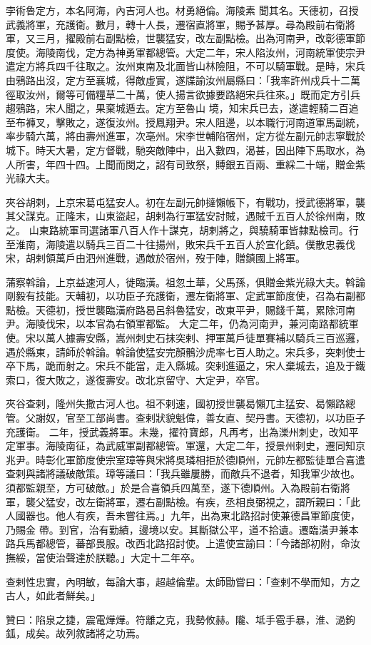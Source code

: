\begin{pinyinscope}
 孛術魯定方，本名阿海，內吉河人也。材勇絕倫。海陵素
 聞其名。天德初，召授武義將軍，充護衛。數月，轉十人長，遷宿直將軍，賜予甚厚。尋為殿前右衛將軍，又三月，擢殿前右副點檢，世襲猛安，改左副點檢。出為河南尹，改彰德軍節度使。海陵南伐，定方為神勇軍都總管。大定二年，宋人陷汝州，河南統軍使宗尹遣定方將兵四千往取之。汝州東南及北面皆山林險阻，不可以騎軍戰。是時，宋兵由鴉路出沒，定方至襄城，得敵虛實，遂牒諭汝州屬縣曰：「我率許州戍兵十二萬徑取汝州，爾等可備糧草二十萬，使人揚言欲據要路絕宋兵往來。」既而定方引兵趨鴉路，宋人聞之，果棄城遁去。定方至魯山
 境，知宋兵已去，遂遣輕騎二百追至布褲叉，擊敗之，遂復汝州。授鳳翔尹。宋人阻邊，以本職行河南道軍馬副統，率步騎六萬，將由壽州進軍，次亳州。宋李世輔陷宿州，定方從左副元帥志寧戰於城下。時天大暑，定方督戰，馳突敵陣中，出入數四，渴甚，因出陣下馬取水，為人所害，年四十四。上聞而閔之，詔有司致祭，賻銀五百兩、重綵二十端，贈金紫光祿大夫。



 夾谷胡剌，上京宋葛屯猛安人。初在左副元帥撻懶帳下，有戰功，授武德將軍，襲其父謀克。正隆末，山東盜起，胡剌為行軍猛安討賊，遇賊千五百人於徐州南，敗之。
 山東路統軍司選諸軍八百人作十謀克，胡剌將之，與驍騎軍皆隸點檢司。行至淮南，海陵遣以騎兵三百二十往揚州，敗宋兵千五百人於宣化鎮。僕散忠義伐宋，胡剌領萬戶由泗州進戰，遇敵於宿州，歿于陣，贈鎮國上將軍。



 蒲察斡論，上京益速河人，徙臨潢。祖忽土華，父馬孫，俱贈金紫光祿大夫。斡論剛毅有技能。天輔初，以功臣子充護衛，遷左衛將軍、定武軍節度使，召為右副都點檢。天德初，授世襲臨潢府路曷呂斜魯猛安，改東平尹，賜錢千萬，累除河南尹。海陵伐宋，以本官為右領軍都監。
 大定二年，仍為河南尹，兼河南路都統軍使。宋以萬人據壽安縣，嵩州刺史石抹突剌、押軍萬戶徒單賽補以騎兵三百巡邏，遇於縣東，請師於斡論。斡論使猛安完顏鶻沙虎率七百人助之。宋兵多，突剌使士卒下馬，跪而射之。宋兵不能當，走入縣城。突剌進逼之，宋人棄城去，追及于鐵索口，復大敗之，遂復壽安。改北京留守、大定尹，卒官。



 夾谷查剌，隆州失撒古河人也。祖不剌速，國初授世襲曷懶兀主猛安、曷懶路總管。父謝奴，官至工部尚書。查剌狀貌魁偉，善女直、契丹書。天德初，以功臣子充護衛。
 二年，授武義將軍。未幾，擢符寶郎，凡再考，出為濼州刺史，改知平定軍事。海陵南征，為武威軍副都總管。軍還，大定二年，授景州刺史，遷同知京兆尹。時彰化軍節度使宗室璋等與宋將吳璘相拒於德順州，元帥左都監徒單合喜遣查剌與諸將議破敵策。璋等議曰：「我兵雖屢勝，而敵兵不退者，知我軍少故也。須都監親至，方可破敵。」於是合喜領兵四萬至，遂下德順州。入為殿前右衛將軍，襲父猛安，改左衛將軍，遷右副點檢。有疾，丞相良弼視之，謂所親曰：「此人國器也。他人有疾，吾未嘗往焉。」九年，出為東北路招討使兼德昌軍節度使，乃賜金
 帶。到官，治有勤績，邊境以安。其斷獄公平，道不拾遺。遷臨潢尹兼本路兵馬都總管，蕃部畏服。改西北路招討使。上遣使宣諭曰：「今諸部初附，命汝撫綏，當使治聲達於朕聽。」大定十二年卒。



 查剌性忠實，內明敏，每論大事，超越倫輩。太師勖嘗曰：「查剌不學而知，方之古人，如此者鮮矣。」



 贊曰：陷泉之捷，震電燁燁。符離之克，我勢攸赫。隴、坻手雹手暴，淮、濄鉤鈲，成矣。故列敘諸將之功焉。



\end{pinyinscope}